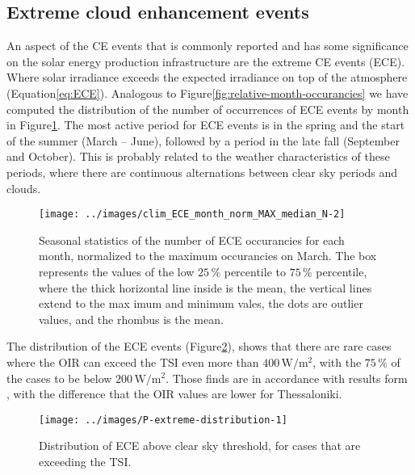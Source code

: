 \documentclass[preprint, 5p,
authoryear]{elsarticle} %
\begin{document}
\hypertarget{extreme-cloud-enhancement-events}{%
\subsection{Extreme cloud enhancement
events}\label{extreme-cloud-enhancement-events}}

An aspect of the CE events that is commonly reported and has some
significance on the solar energy production infrastructure are the
extreme CE events (ECE). Where solar irradiance exceeds the expected
irradiance on top of the atmosphere
(Equation\nobreakspace{}\ref{eq:ECE}). Analogous to
Figure\nobreakspace{}\ref{fig:relative-month-occurancies} we have
computed the distribution of the number of occurrences of ECE events by
month in Figure\nobreakspace{}\ref{fig:relative-month-occurancies-ECE}.
The most active period for ECE events is in the spring and the start of
the summer (March -- June), followed by a period in the late fall
(September and October). This is probably related to the weather
characteristics of these periods, where there are continuous
alternations between clear sky periods and clouds.

\begin{figure}

{\centering \texttt{[image: ../images/clim\_ECE\_month\_norm\_MAX\_median\_N-2]} 

}

\caption{Seasonal statistics of the number of ECE occurancies for each month, normalized to the maximum occurancies on March. The box represents the values of the low $25\,\%$ percentile to $75\,\%$ percentile, where the thick horizontal line inside is the mean, the vertical lines extend to the max imum and minimum vales, the dots are outlier values, and the rhombus is the mean.}\label{fig:relative-month-occurancies-ECE}
\end{figure}

The distribution of the ECE events
(Figure\nobreakspace{}\ref{fig:P-extreme-distribution}), shows that
there are rare cases where the OIR can exceed the TSI even more than
\(400\,\text{W}/\text{m}^2\), with the \(75\,\%\) of the cases to be
below \(200\,\text{W}/\text{m}^2\). Those finds are in accordance with
results form \citet{Vamvakas2020}, with the difference that the OIR
values are lower for Thessaloniki.

\begin{figure}

{\centering \texttt{[image: ../images/P-extreme-distribution-1]} 

}

\caption{Distribution of ECE above clear sky threshold, for cases that are exceeding the TSI.}\label{fig:P-extreme-distribution}
\end{figure}
\end{document}

